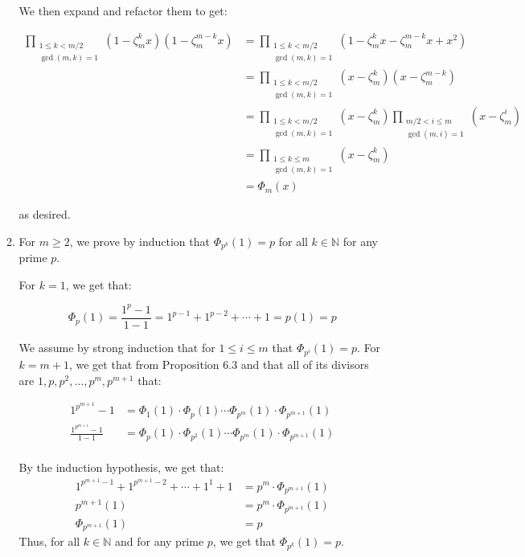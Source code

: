 \documentclass{article}
\begin{document}
\begin{enumerate}
\begin{enumerate}
    We then expand and refactor them to get: 

    \begin{align*}
        \prod_{\substack{1 \leq k < m/2 \\\gcd(m,k) = 1}} (1-\zeta_m^kx) (1 - \zeta_m^{m-k}x) &= \prod_{\substack{1 \leq k < m/2 \\\gcd(m,k) = 1}} (1 - \zeta_m^kx - \zeta_m^{m-k}x + x^2)\\
        &= \prod_{\substack{1 \leq k < m/2 \\\gcd(m,k) = 1}} (x-\zeta_m^k) (x-\zeta_m^{m-k})\\
        &= \prod_{\substack{1 \leq k < m/2 \\\gcd(m,k) = 1}} (x-\zeta_m^k) \prod_{\substack{m/2 < i \leq m \\\gcd(m,i) = 1}} (x-\zeta_m^i)\\
        &= \prod_{\substack{1 \leq k \leq m\\\gcd(m,k) = 1}} (x-\zeta_m^k) \\
        &= \Phi_m(x)
    \end{align*}

    as desired. \\

    \item 
    For $m \geq 2$, we prove by induction that $\Phi_{p^k}(1) = p$ for all $k \in \mathbb{N}$ for any prime $p$.

    For $k = 1$, we get that:

    $$\Phi_p(1) = \frac{1^p - 1}{1 - 1} = 1^{p-1} + 1^{p-2} + \cdots + 1 = p(1) = p$$

    We assume by strong induction that for $1 \leq i \leq m$ that $\Phi_{p^i}(1) = p$. For $k = m + 1$, we get that from Proposition 6.3 and that all of its divisors are $1, p,p^2,\ldots, p^m, p^{m+1}$ that: 

    \begin{align*}
    1^{p^{m+1}} -1 &= \Phi_1(1) \cdot \Phi_p(1) \cdots \Phi_{p^m}(1) \cdot \Phi_{p^{m+1}}(1) \\
    \frac{1^{p^{m+1}} -1}{1 - 1} &= \Phi_p(1) \cdot \Phi_{p^2}(1) \cdots \Phi_{p^m}(1) \cdot \Phi_{p^{m+1}}(1)\\
    \end{align*}

    By the induction hypothesis, we get that: 
    \begin{align*}
    1^{p^{m+1} -1} + 1^{p^{m+1} -2} + \cdots + 1^1 + 1 &= p^m \cdot \Phi_{p^{m+1}}(1) \\
    p^{m+1}(1) &= p^m \cdot \Phi_{p^{m+1}}(1) \\
    \Phi_{p^{m+1}}(1) &= p
    \end{align*} 
    Thus, for all $k \in \mathbb{N}$ and for any prime $p$, we get that $\Phi_{p^k}(1) = p$. \\


\end{enumerate}
\end{enumerate}
\end{document}
